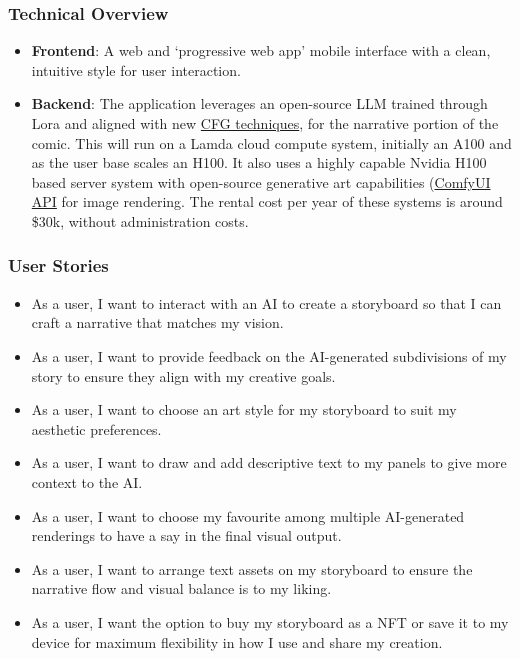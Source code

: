 \subsubsection{Technical Overview}
\begin{itemize}
    \item \textbf{Frontend}: A web and `progressive web app' mobile interface with a clean, intuitive style for user interaction.
    \item \textbf{Backend}: The application leverages an open-source LLM trained through Lora and aligned with new \href{https://arxiv.org/abs/2306.17806}{CFG techniques}, for the narrative portion of the comic. This will run on a Lamda cloud compute system, initially an A100 and as the user base scales an H100. It also uses a highly capable Nvidia H100 based server system with open-source generative art capabilities (\href{https://github.com/comfyanonymous/ComfyUI/blob/master/script_examples/basic_api_example.py}{ComfyUI API} for image rendering. The rental cost per year of these systems is around \$30k, without administration costs.
\end{itemize}

\subsubsection{User Stories}
\begin{itemize}
    \item As a user, I want to interact with an AI to create a storyboard so that I can craft a narrative that matches my vision.
    \item As a user, I want to provide feedback on the AI-generated subdivisions of my story to ensure they align with my creative goals.
    \item As a user, I want to choose an art style for my storyboard to suit my aesthetic preferences.
    \item As a user, I want to draw and add descriptive text to my panels to give more context to the AI.
    \item As a user, I want to choose my favourite among multiple AI-generated renderings to have a say in the final visual output.
    \item As a user, I want to arrange text assets on my storyboard to ensure the narrative flow and visual balance is to my liking.
    \item As a user, I want the option to buy my storyboard as a NFT or save it to my device for maximum flexibility in how I use and share my creation.
\end{itemize}
